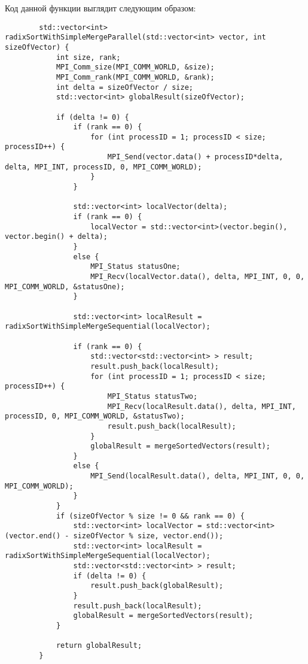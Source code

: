 \documentclass[a4paper, 14pt]{article}
\begin{document}
	Код данной функции выглядит следующим образом:
	\vspace{-1em}
	\begin{verbatim}
		std::vector<int> radixSortWithSimpleMergeParallel(std::vector<int> vector, int sizeOfVector) {
			int size, rank;
			MPI_Comm_size(MPI_COMM_WORLD, &size);
			MPI_Comm_rank(MPI_COMM_WORLD, &rank);
			int delta = sizeOfVector / size;
			std::vector<int> globalResult(sizeOfVector);
			
			if (delta != 0) {
				if (rank == 0) {
					for (int processID = 1; processID < size; processID++) {
						MPI_Send(vector.data() + processID*delta, delta, MPI_INT, processID, 0, MPI_COMM_WORLD);
					}
				}
				
				std::vector<int> localVector(delta);
				if (rank == 0) {
					localVector = std::vector<int>(vector.begin(), vector.begin() + delta);
				}
				else {
					MPI_Status statusOne;
					MPI_Recv(localVector.data(), delta, MPI_INT, 0, 0, MPI_COMM_WORLD, &statusOne);
				}
				
				std::vector<int> localResult = radixSortWithSimpleMergeSequential(localVector);
				
				if (rank == 0) {
					std::vector<std::vector<int> > result;
					result.push_back(localResult);
					for (int processID = 1; processID < size; processID++) {
						MPI_Status statusTwo;
						MPI_Recv(localResult.data(), delta, MPI_INT, processID, 0, MPI_COMM_WORLD, &statusTwo);
						result.push_back(localResult);
					}
					globalResult = mergeSortedVectors(result);
				}
				else {
					MPI_Send(localResult.data(), delta, MPI_INT, 0, 0, MPI_COMM_WORLD);
				}
			}
			if (sizeOfVector % size != 0 && rank == 0) {
				std::vector<int> localVector = std::vector<int>(vector.end() - sizeOfVector % size, vector.end());
				std::vector<int> localResult = radixSortWithSimpleMergeSequential(localVector);
				std::vector<std::vector<int> > result;
				if (delta != 0) {
					result.push_back(globalResult);
				}
				result.push_back(localResult);
				globalResult = mergeSortedVectors(result);
			}
			
			return globalResult;
		}
	\end{verbatim}
	
\end{document}

